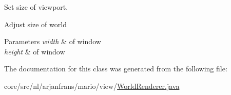 Set size of viewport. 

Adjust size of world 
\begin{DoxyParams}{Parameters}
{\em width} & of window \\
\hline
{\em height} & of window \\
\hline
\end{DoxyParams}


The documentation for this class was generated from the following file\+:\begin{DoxyCompactItemize}
\item 
core/src/nl/arjanfrans/mario/view/\hyperlink{WorldRenderer_8java}{World\+Renderer.\+java}\end{DoxyCompactItemize}

